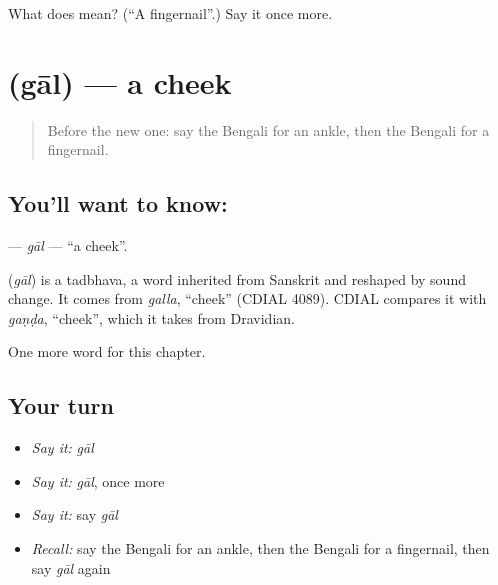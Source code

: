 \begin{tcolorbox}[breakable,colback=teal!4,colframe=teal!35!black,title={Before you move on}]
What does  mean? (\textquotedblleft{}A fingernail\textquotedblright{}.) Say it once more.
\end{tcolorbox}
\section[\texorpdfstring{\bn{গাল} (gāl)}{গাল (gāl)}]{ (gāl) — a cheek}

\label{lesson:BN-C124-gal}



\begin{quote}
Before the new one: say the Bengali for an ankle, then the Bengali for a fingernail.
\end{quote}

\subsection*{You'll want to know: }
\textbf{} — \emph{gāl} — \textquotedblleft{}a cheek\textquotedblright{}.

\begin{cousinweb}
\textbf{} (\emph{gāl}) is a tadbhava, a word inherited from Sanskrit and reshaped by sound change. It comes from \emph{galla}, \textquotedblleft{}cheek\textquotedblright{} (CDIAL 4089). CDIAL compares it with \emph{gaṇḍa}, \textquotedblleft{}cheek\textquotedblright{}, which it takes from Dravidian.
\end{cousinweb}

\begin{grammarlens}[title={What you've built}]
One more word for this chapter.
\end{grammarlens}

\subsection*{Your turn}
\begin{itemize}
\raggedright
  \item \emph{Say it:} \emph{gāl}
  \item \emph{Say it:} \emph{gāl}, once more
  \item \emph{Say it:} say \emph{gāl}
  \item \emph{Recall:} say the Bengali for an ankle, then the Bengali for a fingernail, then say \emph{gāl} again
\end{itemize}

